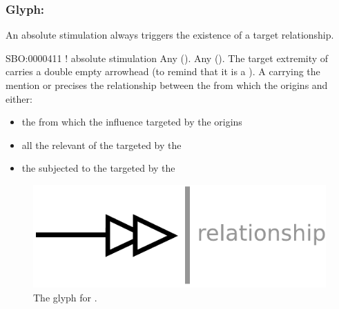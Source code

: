
\subsubsection{Glyph: }\label{sec:absoluteStimulation}

An absolute stimulation always triggers the existence of a target relationship. 

\begin{glyphDescription}
 \glyphSboTerm SBO:0000411 ! absolute stimulation
 \glyphOrigin Any  ().
 \glyphTarget Any  ().
 \glyphEndPoint The target extremity of   carries a double empty arrowhead (to remind that it is a ).
 \glyphAux A  carrying the mention  or  precises the relationship between the  from which the  origins and either:
\begin{itemize}
\item the  from which the influence targeted by the  origins
\item all the relevant  of the  targeted by the 
\item the  subjected to the  targeted by the 
\end{itemize}
 \end{glyphDescription}

\begin{figure}[H]
  \centering
  \includegraphics[scale = 0.5]{images/absoluteStimulation}
  \caption{The \ER glyph for .}
  \label{fig:absoluteStimulation}
\end{figure}

